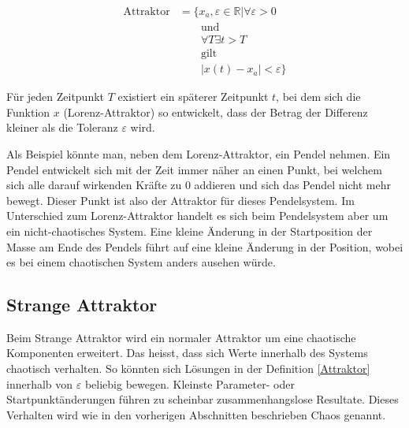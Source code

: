 \begin{align}
\label{Attraktor} \text{Attraktor} &= \{ x_a,\varepsilon \in \mathbb{R}| \forall \varepsilon > 0 \nonumber\\
&\qquad {} \text{und} \nonumber\\
&\qquad {}  \forall T \exists t > T  \nonumber\\
&\qquad {}\text{gilt} \nonumber\\
&\qquad {} | x(t) - x_a | < \varepsilon \} 
\end{align}

Für jeden Zeitpunkt $T$ existiert ein späterer Zeitpunkt $t$, bei dem sich die Funktion $x$ (Lorenz-Attraktor) so entwickelt, dass der Betrag der Differenz kleiner als die Toleranz $\varepsilon$ wird. 

Als Beispiel könnte man, neben dem Lorenz-Attraktor, ein Pendel nehmen. Ein Pendel entwickelt sich mit der Zeit immer näher an einen Punkt, bei welchem sich alle darauf wirkenden Kräfte zu 0 addieren und sich das Pendel nicht mehr bewegt. Dieser Punkt ist also der Attraktor für dieses Pendelsystem. Im Unterschied zum Lorenz-Attraktor handelt es sich beim Pendelsystem aber um ein nicht-chaotisches System. Eine kleine Änderung in der Startposition der Masse am Ende des Pendels führt auf eine kleine Änderung in der Position, wobei es bei einem chaotischen System anders ausehen würde. 

\subsection{Strange Attraktor}
Beim Strange Attraktor wird ein normaler Attraktor um eine chaotische Komponenten erweitert. Das heisst, dass sich Werte innerhalb des Systems chaotisch verhalten. So könnten sich Lösungen in der Definition \eqref{Attraktor} innerhalb von $\varepsilon$ beliebig bewegen. Kleinste Parameter- oder Startpunktänderungen führen zu scheinbar zusammenhangslose Resultate. Dieses Verhalten wird wie in den vorherigen Abschnitten beschrieben Chaos genannt.
